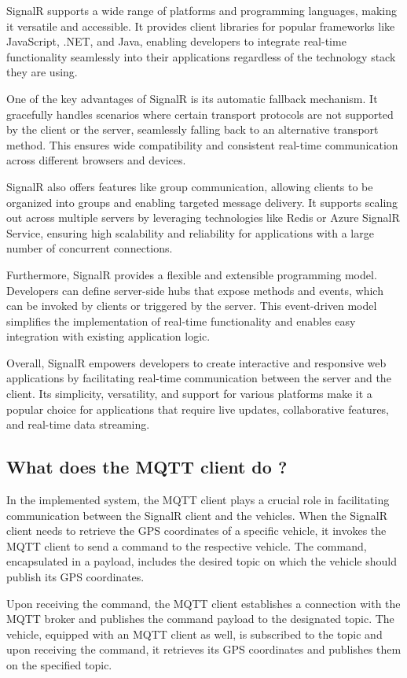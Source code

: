 \documentclass[
12pt,
oneside, 
onehalfspacing, 
nolistspacing, 
parskip, 
chapterinoneline, 
]{AASTCOMPUTER}
\begin{document}
SignalR supports a wide range of platforms and programming languages, making it versatile and accessible. It provides client libraries for popular frameworks like JavaScript, .NET, and Java, enabling developers to integrate real-time functionality seamlessly into their applications regardless of the technology stack they are using.

One of the key advantages of SignalR is its automatic fallback mechanism. It gracefully handles scenarios where certain transport protocols are not supported by the client or the server, seamlessly falling back to an alternative transport method. This ensures wide compatibility and consistent real-time communication across different browsers and devices.

SignalR also offers features like group communication, allowing clients to be organized into groups and enabling targeted message delivery. It supports scaling out across multiple servers by leveraging technologies like Redis or Azure SignalR Service, ensuring high scalability and reliability for applications with a large number of concurrent connections.

Furthermore, SignalR provides a flexible and extensible programming model. Developers can define server-side hubs that expose methods and events, which can be invoked by clients or triggered by the server. This event-driven model simplifies the implementation of real-time functionality and enables easy integration with existing application logic.

Overall, SignalR empowers developers to create interactive and responsive web applications by facilitating real-time communication between the server and the client. Its simplicity, versatility, and support for various platforms make it a popular choice for applications that require live updates, collaborative features, and real-time data streaming.
\newpage
\subsection{What does the MQTT client do ?}
In the implemented system, the MQTT client plays a crucial role in facilitating communication between the SignalR client and the vehicles. When the SignalR client needs to retrieve the GPS coordinates of a specific vehicle, it invokes the MQTT client to send a command to the respective vehicle. The command, encapsulated in a payload, includes the desired topic on which the vehicle should publish its GPS coordinates.

Upon receiving the command, the MQTT client establishes a connection with the MQTT broker and publishes the command payload to the designated topic. The vehicle, equipped with an MQTT client as well, is subscribed to the topic and upon receiving the command, it retrieves its GPS coordinates and publishes them on the specified topic.
\end{document}
